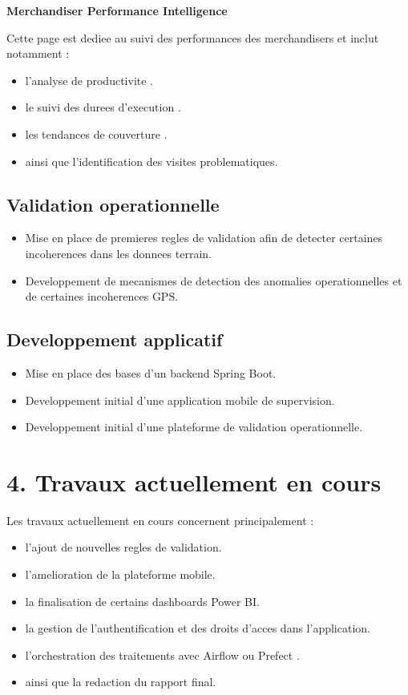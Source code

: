 \documentclass[12pt,a4paper]{article}
\begin{document}
\textbf{Merchandiser Performance Intelligence}

Cette page est dediee au suivi des performances des merchandisers et inclut notamment :

\begin{itemize}
    \item l'analyse de productivite .
    \item le suivi des durees d'execution .
    \item les tendances de couverture .
    \item ainsi que l'identification des visites problematiques.
\end{itemize}

\subsection*{Validation operationnelle}

\begin{itemize}
    \item Mise en place de premieres regles de validation afin de detecter certaines incoherences dans les donnees terrain.
    \item Developpement de mecanismes de detection des anomalies operationnelles et de certaines incoherences GPS.
\end{itemize}

\subsection*{Developpement applicatif}

\begin{itemize}
    \item Mise en place des bases d'un backend Spring Boot.
    \item Developpement initial d'une application mobile de supervision.
    \item Developpement initial d'une plateforme de validation operationnelle.
\end{itemize}

\section*{4. Travaux actuellement en cours}

Les travaux actuellement en cours concernent principalement :

\begin{itemize}
    \item l'ajout de nouvelles regles de validation.
    \item l'amelioration de la plateforme mobile.
    \item la finalisation de certains dashboards Power BI.
    \item la gestion de l'authentification et des droits d'acces dans l'application.
    \item l'orchestration des traitements avec Airflow ou Prefect .
    \item ainsi que la redaction du rapport final.
\end{itemize}
\end{document}
